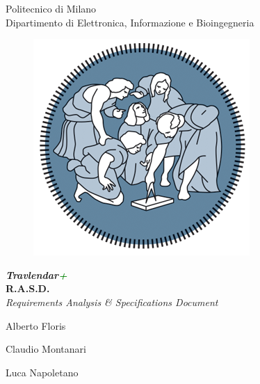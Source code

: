 \thispagestyle{empty}
\begin{center}

	\Huge Politecnico di Milano  \\   	\vspace{14pt}
    \Large Dipartimento di Elettronica, Informazione e Bioingegneria
    
    \vspace{30pt}
    
      \begin{figure}[h]
      	\centering
        \includegraphics[scale=0.7]{Pictures/logo.png}
      \end{figure}
    
    \vspace{25pt}
    
    \Huge \textbf{\emph{Travlendar\textcolor{Green}{+}}} 
    \\
    \vspace{12pt}
    \huge \textbf{R.A.S.D.} \\
    \vspace{7pt}
    \Large \emph{Requirements Analysis \& Specifications Document} \\
    
    \vspace{100pt}
    
    \large Alberto Floris \\
    
    \vspace{5pt}
    
    \large Claudio Montanari \\
    
    \vspace{5pt}
    
    \large Luca Napoletano
    
    
\end{center}